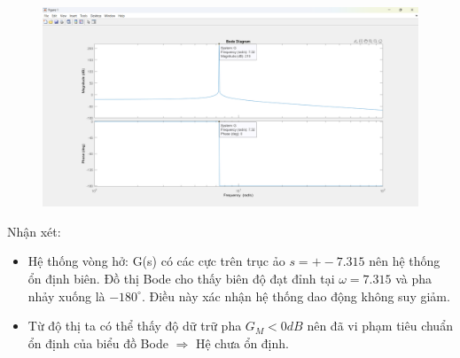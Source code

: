     \begin{figure}[H]
        \centering
        \includegraphics[width=1\textwidth]{pictures/bode.png}
    \end{figure}
    Nhận xét:
    \begin{itemize}
        \item Hệ thống vòng hở: G(s) có các cực trên trục ảo $s=+-7.315$ nên hệ thống ổn định biên. Đồ thị Bode cho thấy biên độ đạt đỉnh tại $\omega=7.315$ và pha nhảy xuống là $-180^\circ$. Điều này xác nhận hệ thống dao động không suy giảm.
        \item Từ độ thị ta có thể thấy độ dữ trữ pha $G_M < 0 dB$ nên đã vi phạm tiêu chuẩn ổn định của biểu đồ Bode $\Rightarrow$ Hệ chưa ổn định. 
    \end{itemize}

